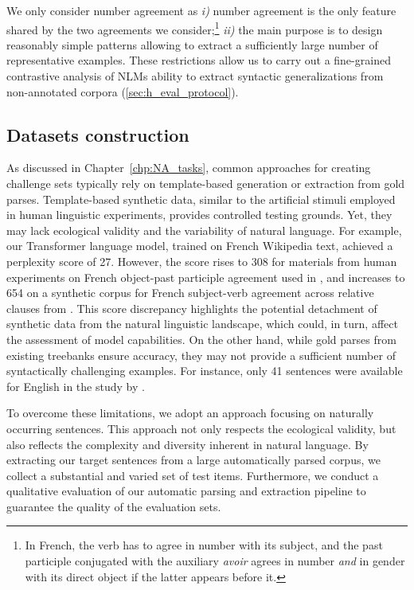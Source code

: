 We only consider number agreement as \textit{i)} number
agreement is the only feature shared by the two agreements we
consider;\footnote{In French, the verb has to agree in number with its
  subject, and the past participle conjugated with the auxiliary
  \textit{avoir} agrees in number \emph{and} in gender with its direct object
  if the latter appears before it.}  \textit{ii)} the main purpose is to
design reasonably simple patterns allowing to extract a
sufficiently large number of representative examples. These restrictions allow us to carry out a fine-grained contrastive
analysis of NLMs ability to extract syntactic generalizations
from non-annotated corpora (\textsection\ref{sec:h_eval_protocol}).


\subsection{Datasets construction} \label{sec:NA_data}

As discussed in Chapter~\ref{chp:NA_tasks}, common approaches for creating challenge sets typically rely on template-based generation or extraction from gold parses. Template-based synthetic data, similar to the artificial stimuli employed in human linguistic experiments, provides controlled testing grounds. Yet, they may lack ecological validity and the variability of natural language. For example, our Transformer language model, trained on French Wikipedia text, achieved a perplexity score of 27. However, the score rises to 308 for materials from human experiments on French object-past participle agreement used in \cite{villata2017intervention}, and increases to 654 on a synthetic corpus for French subject-verb agreement across relative clauses from \cite{mueller-etal-2020-cross}. This score discrepancy highlights the potential detachment of synthetic data from the natural linguistic landscape, which could, in turn, affect the assessment of model capabilities. On the other hand, while gold parses from existing treebanks ensure accuracy, they may not provide a sufficient number of syntactically challenging examples. For instance, only 41 sentences were available for English in the study by \cite{gulordava-etal-2018-colorless}. 

To overcome these limitations, we adopt an approach focusing on naturally occurring sentences. This approach not only respects the ecological validity, but also reflects the complexity and diversity inherent in natural language. By extracting our target sentences from a large automatically parsed corpus, we collect a substantial and varied set of test items. Furthermore, we conduct a qualitative evaluation of our automatic parsing and extraction pipeline to guarantee the quality of the evaluation sets.

